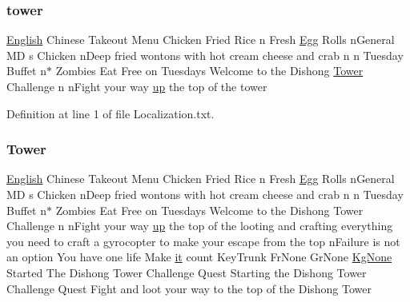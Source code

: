\subsubsection{\texorpdfstring{tower}{tower}}
{\footnotesize\ttfamily \mbox{\hyperlink{_sphere_i_i_01_winter_01_project_2_config_2_localization_8txt_ad896b63205779b1b09e86d941ce13976}{English}} Chinese Takeout Menu Chicken Fried Rice n Fresh \mbox{\hyperlink{_sphere_i_i_01_winter_01_project_2_config_2_localization_8txt_a55334ab0b48a68a93004334728020f15}{Egg}} Rolls n\+General MD s Chicken n\+Deep fried wontons with hot cream cheese and crab n n Tuesday Buffet n$\ast$ Zombies Eat Free on Tuesdays Welcome to the Dishong \mbox{\hyperlink{_dishong_01_tower_01_challenge_2_config_2_localization_8txt_ad03a7286db82f171f8e82a1eaf4e3eaf}{Tower}} Challenge n n\+Fight your way \mbox{\hyperlink{_the_01_restless_01_curse_2_config_2_localization_01-_01_quest_8txt_a2f8d5a9cc6c08e259de10d34d28f85c4}{up}} the top of the tower}



Definition at line 1 of file Localization.\+txt.

\mbox{\label{_dishong_01_tower_01_challenge_2_config_2_localization_8txt_ad03a7286db82f171f8e82a1eaf4e3eaf}} 
\subsubsection{\texorpdfstring{Tower}{Tower}}
{\footnotesize\ttfamily \mbox{\hyperlink{_sphere_i_i_01_winter_01_project_2_config_2_localization_8txt_ad896b63205779b1b09e86d941ce13976}{English}} Chinese Takeout Menu Chicken Fried Rice n Fresh \mbox{\hyperlink{_sphere_i_i_01_winter_01_project_2_config_2_localization_8txt_a55334ab0b48a68a93004334728020f15}{Egg}} Rolls n\+General MD s Chicken n\+Deep fried wontons with hot cream cheese and crab n n Tuesday Buffet n$\ast$ Zombies Eat Free on Tuesdays Welcome to the Dishong Tower Challenge n n\+Fight your way \mbox{\hyperlink{_the_01_restless_01_curse_2_config_2_localization_01-_01_quest_8txt_a2f8d5a9cc6c08e259de10d34d28f85c4}{up}} the top of the looting and crafting everything you need to craft a gyrocopter to make your escape from the top n\+Failure is not an option You have one life Make \mbox{\hyperlink{_the_01_restless_01_curse_2_config_2_localization_01-_01_quest_8txt_a741b285909bea4855b886664c2dcd50c}{it}} count Key\+Trunk Fr\+None Gr\+None \mbox{\hyperlink{_the_01_restless_01_curse_2_config_2_localization_8txt_acc1c43e0980c5828bcfaf85313744919}{Kg\+None}} Started The Dishong Tower Challenge Quest Starting the Dishong Tower Challenge Quest Fight and loot your way to the top of the Dishong Tower}



